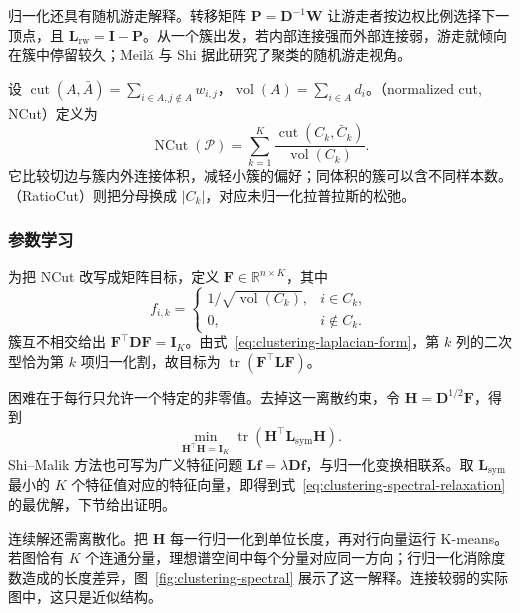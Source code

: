归一化还具有随机游走解释。转移矩阵 $\bm{P}=\bm{D}^{-1}\bm{W}$ 让游走者按边权比例选择下一顶点，且 $\bm{L}_{\mathrm{rw}}=\bm{I}-\bm{P}$。从一个簇出发，若内部连接强而外部连接弱，游走就倾向在簇中停留较久；Meilă 与 Shi 据此研究了聚类的随机游走视角。

设 $\operatorname{cut}(A,\bar A)=\sum_{i\in A,j\notin A}w_{i,j}$，$\operatorname{vol}(A)=\sum_{i\in A}d_i$。（normalized cut, NCut）定义为
\begin{equation}
 \operatorname{NCut}(\mathcal{P})
 =\sum_{k=1}^K
 \frac{\operatorname{cut}(C_k,\bar C_k)}
      {\operatorname{vol}(C_k)}.
 \label{eq:clustering-ncut}
\end{equation}
它比较切边与簇内外连接体积，减轻小簇的偏好；同体积的簇可以含不同样本数。（RatioCut）则把分母换成 $|C_k|$，对应未归一化拉普拉斯的松弛。

\subsubsection{参数学习}

为把 NCut 改写成矩阵目标，定义 $\bm{F}\in\mathbb{R}^{n\times K}$，其中
\[
 f_{i,k}=
 \begin{cases}
  1/\sqrt{\operatorname{vol}(C_k)},&i\in C_k,\\
  0,&i\notin C_k.
 \end{cases}
\]
簇互不相交给出 $\bm{F}^{\top}\bm{D}\bm{F}=\bm{I}_K$。由式~\eqref{eq:clustering-laplacian-form}，第 $k$ 列的二次型恰为第 $k$ 项归一化割，故目标为 $\operatorname{tr}(\bm{F}^{\top}\bm{L}\bm{F})$。

困难在于每行只允许一个特定的非零值。去掉这一离散约束，令 $\bm{H}=\bm{D}^{1/2}\bm{F}$，得到
\begin{equation}
 \min_{\bm{H}^{\top}\bm{H}=\bm{I}_K}
 \operatorname{tr}(\bm{H}^{\top}
                   \bm{L}_{\mathrm{sym}}\bm{H}).
 \label{eq:clustering-spectral-relaxation}
\end{equation}
Shi--Malik 方法也可写为广义特征问题 $\bm{L}\bm{f}=\lambda\bm{D}\bm{f}$，与归一化变换相联系。取 $\bm{L}_{\mathrm{sym}}$ 最小的 $K$ 个特征值对应的特征向量，即得到式~\eqref{eq:clustering-spectral-relaxation} 的最优解，下节给出证明。

连续解还需离散化。把 $\bm{H}$ 每一行归一化到单位长度，再对行向量运行 K-means。若图恰有 $K$ 个连通分量，理想谱空间中每个分量对应同一方向；行归一化消除度数造成的长度差异，图~\ref{fig:clustering-spectral} 展示了这一解释。连接较弱的实际图中，这只是近似结构。

